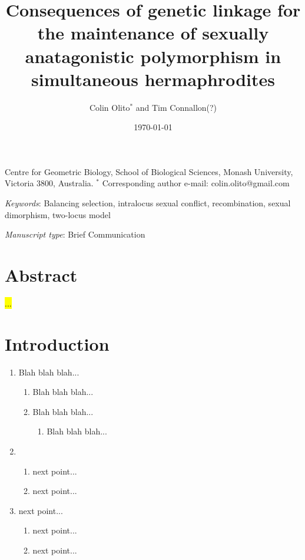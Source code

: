 \documentclass{article}
\title{Consequences of genetic linkage for the maintenance of sexually anatagonistic polymorphism in simultaneous hermaphrodites}
\author{Colin Olito$^{\ast}$ and Tim Connallon(?)}
\date{\today}
\begin{document}
\maketitle


\noindent{} Centre for Geometric Biology, School of Biological Sciences, Monash University, Victoria 3800, Australia.
\noindent{} $^\ast$ Corresponding author e-mail: colin.olito@gmail.com

\bigskip

\noindent{} \textit{Keywords}: Balancing selection, intralocus sexual conflict, recombination, sexual dimorphism, two-locus model

\bigskip

\noindent{} \textit{Manuscript type}: Brief Communication

\bigskip


\linenumbers
\modulolinenumbers[1]
\renewcommand\linenumberfont{\normalfont\small}


\newpage{}
\section*{Abstract}

\noindent{} \hl{...}

\section*{Introduction}

\begin{enumerate}
	\item Blah blah blah...
		\begin{enumerate}
			\item Blah blah blah...
			\item Blah blah blah...
				\begin{enumerate}
					\item Blah blah blah...
				\end{enumerate}
		\end{enumerate}

	\item 
		\begin{enumerate}
			\item next point...
			\item next point...
		\end{enumerate}
	
	\item next point...
		\begin{enumerate}
			\item next point...
			\item next point...
		\end{enumerate}
\end{enumerate}
\end{document}
